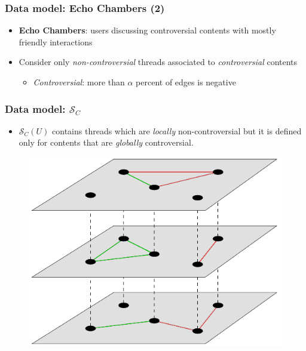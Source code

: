 \documentclass[aspectratio=169]{beamer}
\begin{document}
\begin{frame}[c]
	\frametitle{Data model: Echo Chambers (2)}

	\begin{itemize}
		\item \textbf{Echo Chambers}: users discussing controversial contents
		      with mostly friendly interactions
		      \pause
		      \medskip
		      \begin{center}
			      \bigg\downarrow
		      \end{center}
		      \medskip
		\item Consider only \emph{non-controversial} threads associated to
		      \emph{controversial} contents
		      \begin{itemize}
			      \item \emph{Controversial}: more than $\alpha $ percent of
			            edges is negative
		      \end{itemize}
	\end{itemize}


\end{frame}

\begin{frame}[c]
	\frametitle{Data model: $\mathcal{S}_C$}
	\begin{itemize}
		\item $\mathcal{S}_C (U)$ contains threads which are \emph{locally}
		      non-controversial but it is defined only for contents that are
		      \emph{globally} controversial.
	\end{itemize}
	\begin{figure}
		\centering
		\includegraphics[width=0.3\linewidth]{img/multiplex-signed-graph.png}
	\end{figure}
\end{frame}
\end{document}
